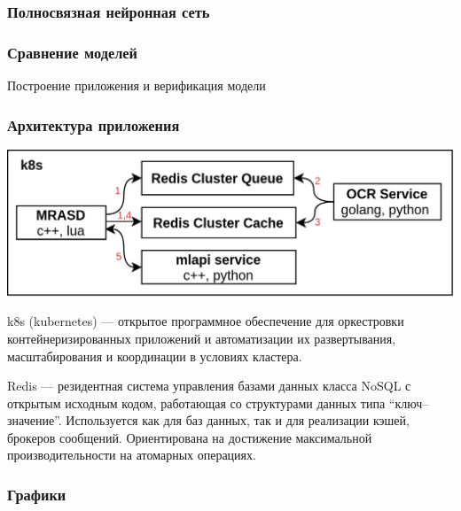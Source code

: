 \documentclass[compress,professionalfont]{beamer}
\begin{document}
\begin{frame}
\frametitle{Полносвязная нейронная сеть}

\end{frame}

\begin{frame}
\frametitle{Сравнение моделей}

\end{frame}

\begin{frame}

\begin{center}
Построение приложения и верификация модели
\end{center}

\end{frame}

\begin{frame}
\frametitle{Архитектура приложения}

\begin{center}
\includegraphics[width=.8\textwidth]{architecture.jpg}
\end{center}

k8s (kubernetes) --- открытое программное обеспечение для оркестровки контейнеризированных приложений и автоматизации их развертывания, масштабирования и координации в условиях кластера.

Redis --- резидентная система управления базами данных класса NoSQL с открытым исходным кодом, работающая со структурами данных типа ``ключ--значение''. Используется как для баз данных, так и для реализации кэшей, брокеров сообщений. Ориентирована на достижение максимальной производительности на атомарных операциях.

\end{frame}

\begin{frame}
\frametitle{Графики}

\end{frame}
\end{document}
